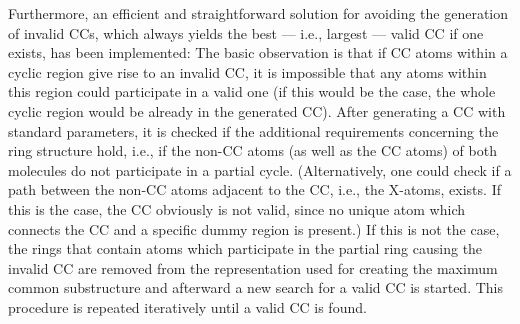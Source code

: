 Furthermore, an efficient and straightforward solution for avoiding the generation of invalid CCs, which always yields the best --- i.e., largest --- valid CC if one exists, has been implemented:
The basic observation is that if CC atoms within a cyclic region give rise to an invalid CC, it is impossible that any atoms within this region could participate in a valid one (if this would be the case, the whole cyclic region would be already in the generated CC).
After generating a CC with standard parameters, it is checked if the additional requirements concerning the ring structure hold, i.e., if the non-CC atoms (as well as the CC atoms) of both molecules do not participate in a partial cycle.
(Alternatively, one could check if a path between the non-CC atoms adjacent to the CC, i.e., the X-atoms, exists. If this is the case, the CC obviously is not valid, since no unique atom which connects the CC and a specific dummy region is present.) If this is not the case, the rings that contain atoms which participate in the partial ring causing the invalid CC are removed from the representation used for creating the maximum common substructure and afterward a new search for a valid CC is started. This procedure is repeated iteratively until a valid CC is found.





